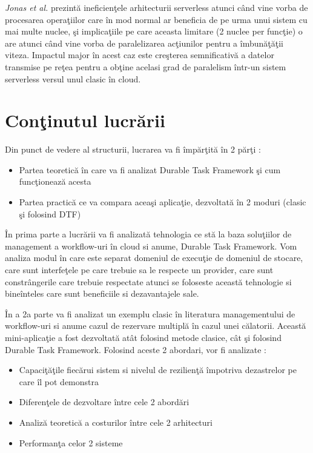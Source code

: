 \documentclass[a4paper,12pt]{report}
\begin{document}
\par\emph{Jonas et al.} \cite{jonas2017} prezintă ineficienţele arhitecturii serverless atunci când vine vorba de procesarea operaţiilor care în mod normal ar beneficia de pe urma unui sistem cu mai multe nuclee, şi implicaţiile pe care aceasta limitare (2 nuclee per funcţie) o are atunci când vine vorba de paralelizarea acţiunilor pentru a îmbunăţăţii viteza. Impactul major în acest caz este creşterea semnificativă a datelor transmise pe reţea pentru a obţine acelasi grad de paralelism într-un sistem serverless versul unul clasic în cloud. 


\section{Conţinutul lucrării}
 Din punct de vedere al structurii, lucrarea va fi împărţită în 2 părţi :
\begin{itemize}
\item Partea teoretică în care va fi analizat Durable Task Framework şi cum funcţionează acesta
\item Partea practică ce va compara aceaşi aplicaţie, dezvoltată în 2 moduri (clasic şi folosind DTF)
\end{itemize}
\par În prima parte a lucrării va fi analizată tehnologia ce stă la baza soluţiilor de management a workflow-uri în cloud si anume, Durable Task Framework. Vom analiza modul în care este separat domeniul de execuţie de domeniul de stocare, care sunt interfeţele pe care trebuie sa le respecte un provider, care sunt constrângerile care trebuie respectate atunci se foloseste această tehnologie si bineînteles care sunt beneficiile si dezavantajele sale. 
\par În a 2a parte va fi analizat un exemplu clasic în literatura managementului de workflow-uri si anume cazul de rezervare multiplă în cazul unei călatorii. Această mini-aplicaţie a fost dezvoltată atât folosind metode clasice, cât şi folosind Durable Task Framework. Folosind aceste 2 abordari, vor fi analizate : 
\begin{itemize}
\item Capaciţăţile fiecărui sistem si nivelul de rezilienţă împotriva dezastrelor pe care îl pot demonstra
\item Diferenţele de dezvoltare între cele 2 abordări
\item Analiză teoretică a costurilor între cele 2 arhitecturi 
\item Performanţa celor 2 sisteme
\end{itemize}
\end{document}
